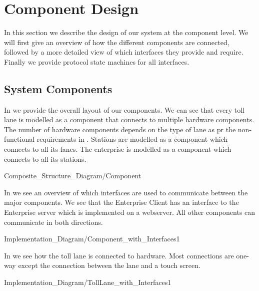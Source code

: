 \section{Component Design}
\madeby{\mb}{\mt}
In this section we describe the design of our system at the component level. We will first give an overview of how the different components are connected, followed by a more detailed view of which interfaces they provide and require. Finally we provide protocol state machines for all interfaces.
\subsection{System Components}
\madeby{\mt}{\mb}
In  we provide the overall layout of our components. We can see that every toll lane is modelled as a component that connects to multiple hardware components. The number of hardware components depends on the type of lane as pr the non-functional requirements in . Stations are modelled as a component which connects to all its lanes. The enterprise is modelled as a component which connects to all its stations.

\begin{mylandscapefigure}{Composite_Structure_Diagram/Component}
\caption{Overview of components and their connections. \madeby{\kj}{\af}}
\label{fig:component}
\end{mylandscapefigure}

In  we see an overview of which interfaces are used to communicate between the major components. We see that the Enterprise Client has an interface to the Enterprise server which is implemented on a webserver. All other components can communicate in both directions.
\begin{myfigure}{Implementation_Diagram/Component_with_Interfaces}{1}
\caption{Overview of interfaces between major components. \madeby{\jb}{\af}}
\label{fig:componentI}
\end{myfigure}

In  we see how the toll lane is connected to hardware. Most connections are one-way except the connection between the lane and a touch screen.
\begin{myfigure}{Implementation_Diagram/TollLane_with_Interfaces}{1}
\caption{Overview of interfaces between a toll lane and its hardware. \madeby{\mb}{\kj}}
\label{fig:componentLaneI}
\end{myfigure}

